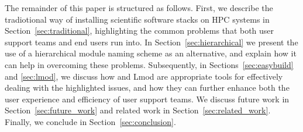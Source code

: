 The remainder of this paper is structured as follows. First, we describe the
tradiotional way of installing scientific software stacks on HPC systems in
Section~\ref{sec:traditional}, highlighting the common problems that both user
support teams and end users run into. In Section~\ref{sec:hierarchical} we
present the use of a hierarchical module naming scheme as an alternative, and
explain how it can help in overcoming these problems. Subsequently, in
Sections~\ref{sec:easybuild} and \ref{sec:lmod}, we discuss how \easybuild{} and
Lmod are appropriate tools for effectively dealing with the highlighted issues, 
and how they can further enhance both the user experience and efficiency of user
support teams. We discuss future work in Section~\ref{sec:future_work} and related
work in Section~\ref{sec:related_work}. Finally, we conclude in
Section~\ref{sec:conclusion}.

